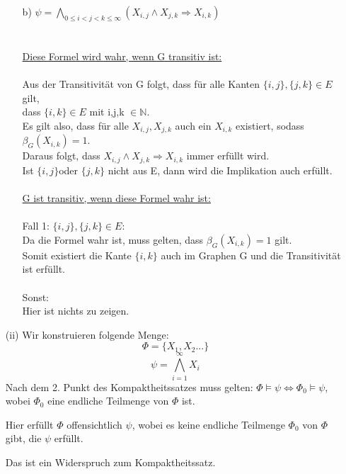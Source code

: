 \documentclass[a4paper,10pt]{article}
\begin{document}
\begin{enumerate}
\begin{enumerate}
		\item[b)]
		\( \psi = \bigwedge\limits_{0 \leq i < j < k \leq \infty}(X_{i,j} \wedge X_{j,k} \Rightarrow X_{i,k}) \)
		\\
		\\
		\\
		\underline{Diese Formel wird wahr, wenn G transitiv ist:}\\
		\\
		Aus der Transitivität von G folgt, dass für alle Kanten $\{i,j\}, \{j,k\} \in E$ gilt, \\
		dass $\{i,k\} \in E$ mit i,j,k $\in \mathbb{N}$. \\
		Es gilt also, dass für alle $X_{i,j}, X_{j,k}$ auch ein $X_{i,k}$ existiert, sodass $\beta_G (X_{i,k}) = 1$. \\
		Daraus folgt, dass $X_{i,j} \wedge X_{j,k} \Rightarrow X_{i,k}$ immer erfüllt wird. \\
		Ist $\{i,j\}$oder $\{j,k\}$ nicht aus E, dann wird die Implikation auch erfüllt.
		\\
		\\
		\underline{G ist transitiv, wenn diese Formel wahr ist:}\\
		\\
		Fall 1: $\{i,j\},\{j,k\} \in E$:
		\\
		Da die Formel wahr ist, muss gelten, dass $\beta_G(X_{i,k}) = 1$ gilt.\\
		Somit existiert die Kante $\{i,k\}$ auch im Graphen G und die Transitivität ist erfüllt.\\
		\\
		Sonst:
		\\
		Hier ist nichts zu zeigen.
		
		
		\end{enumerate}
	\item[(ii)]
	Wir konstruieren folgende Menge: 
	$$ \Phi = \{X_1,X_2...\}$$
	$$\psi = \bigwedge_{i=1}^{\infty} X_i $$
	Nach dem 2. Punkt des Kompaktheitssatzes muss gelten: $\Phi \models \psi \Leftrightarrow \Phi_0 \models \psi$, wobei $\Phi_0$ eine endliche Teilmenge von $\Phi$ ist.

	Hier erfüllt $\Phi$ offensichtlich $\psi$, wobei es keine endliche Teilmenge $\Phi_0$ von $\Phi$ gibt, die $\psi$ erfüllt. 

	Das ist ein Widerspruch zum Kompaktheitssatz.
 
	\end{enumerate}
\end{document}
